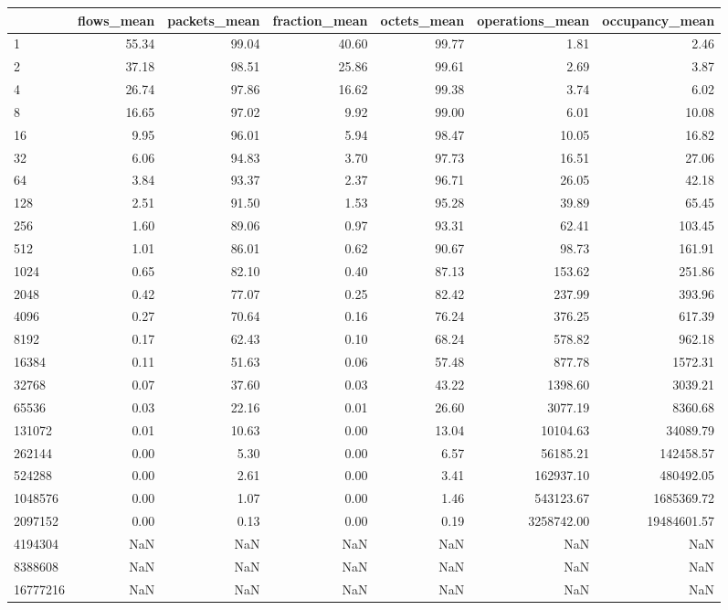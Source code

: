 \begin{tabular}{lrrrrrr}
\toprule
 & flows_mean & packets_mean & fraction_mean & octets_mean & operations_mean & occupancy_mean \\
\midrule
1 & 55.34 & 99.04 & 40.60 & 99.77 & 1.81 & 2.46 \\
2 & 37.18 & 98.51 & 25.86 & 99.61 & 2.69 & 3.87 \\
4 & 26.74 & 97.86 & 16.62 & 99.38 & 3.74 & 6.02 \\
8 & 16.65 & 97.02 & 9.92 & 99.00 & 6.01 & 10.08 \\
16 & 9.95 & 96.01 & 5.94 & 98.47 & 10.05 & 16.82 \\
32 & 6.06 & 94.83 & 3.70 & 97.73 & 16.51 & 27.06 \\
64 & 3.84 & 93.37 & 2.37 & 96.71 & 26.05 & 42.18 \\
128 & 2.51 & 91.50 & 1.53 & 95.28 & 39.89 & 65.45 \\
256 & 1.60 & 89.06 & 0.97 & 93.31 & 62.41 & 103.45 \\
512 & 1.01 & 86.01 & 0.62 & 90.67 & 98.73 & 161.91 \\
1024 & 0.65 & 82.10 & 0.40 & 87.13 & 153.62 & 251.86 \\
2048 & 0.42 & 77.07 & 0.25 & 82.42 & 237.99 & 393.96 \\
4096 & 0.27 & 70.64 & 0.16 & 76.24 & 376.25 & 617.39 \\
8192 & 0.17 & 62.43 & 0.10 & 68.24 & 578.82 & 962.18 \\
16384 & 0.11 & 51.63 & 0.06 & 57.48 & 877.78 & 1572.31 \\
32768 & 0.07 & 37.60 & 0.03 & 43.22 & 1398.60 & 3039.21 \\
65536 & 0.03 & 22.16 & 0.01 & 26.60 & 3077.19 & 8360.68 \\
131072 & 0.01 & 10.63 & 0.00 & 13.04 & 10104.63 & 34089.79 \\
262144 & 0.00 & 5.30 & 0.00 & 6.57 & 56185.21 & 142458.57 \\
524288 & 0.00 & 2.61 & 0.00 & 3.41 & 162937.10 & 480492.05 \\
1048576 & 0.00 & 1.07 & 0.00 & 1.46 & 543123.67 & 1685369.72 \\
2097152 & 0.00 & 0.13 & 0.00 & 0.19 & 3258742.00 & 19484601.57 \\
4194304 & NaN & NaN & NaN & NaN & NaN & NaN \\
8388608 & NaN & NaN & NaN & NaN & NaN & NaN \\
16777216 & NaN & NaN & NaN & NaN & NaN & NaN \\
\bottomrule
\end{tabular}
